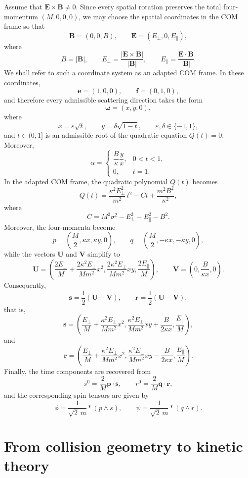 \documentclass[12pt]{article}
\theoremstyle{plain}
\theoremstyle{definition}
\begin{document}
Assume that ${\bm E}\times{\bm B}\neq0$.  
Since every spatial rotation preserves the total four-momentum
$(M,0,0,0)$, we may choose the spatial coordinates in the COM frame so
that
\[
{\bm B}=(0,0,B),
\qquad
{\bm E}=(E_{\perp},0,E_{\parallel}),
\]
where
\[
B=|{\bm B}|,
\qquad
E_{\perp}=\frac{|{\bm E}\times{\bm B}|}{|{\bm B}|},
\qquad
E_{\parallel}
=\frac{{\bm E}\cdot{\bm B}}{|{\bm B}|}.
\]
We shall refer to such a coordinate system as an
adapted COM frame.
In these coordinates,
\[
{\bm e}=(1,0,0),
\qquad
{\bm f}=(0,1,0),
\]
and therefore every admissible scattering direction takes the form
\[
{\bm\omega}
=
(x,y,0),
\]
where
\[
x=\varepsilon\sqrt t,
\qquad
y=\delta\sqrt{1-t},\qquad
\varepsilon,\delta\in\{-1,1\},
\]
and $t\in(0,1]$ is an admissible root of the quadratic equation
$Q(t)=0$.
Moreover,
\[
\alpha=
\begin{cases}
\dfrac{B}{\kappa}\dfrac{y}{x}, & 0<t<1,\\[1.2ex]
0, & t=1.
\end{cases}
\]
In the adapted COM frame, the quadratic polynomial $Q(t)$ becomes
\[
Q(t)
=
\frac{\kappa^2E_\perp^2}{m^2}\,t^2
-
Ct
+
\frac{m^2B^2}{\kappa^2},
\]
where
\[
C=M^2\sigma^2-E_\perp^2-E_\parallel^2-B^2.
\]
Moreover, the four-momenta become
\[
p=\left(\frac M2,\kappa x,\kappa y,0\right),
\qquad
q=\left(\frac M2,-\kappa x,-\kappa y,0\right),
\]
while the vectors ${\bm U}$ and ${\bm V}$ simplify to
\[
{\bm U}
=
\left(
\frac{2E_\perp}{M}
+\frac{2\kappa^2E_\perp}{Mm^2}x^2,
\frac{2\kappa^2E_\perp}{Mm^2}xy,
\frac{2E_\parallel}{M}
\right),
\qquad
{\bm V}
=
\left(
0,
\frac{B}{\kappa x},
0
\right).
\]
Consequently,
\[
{\bm s}
=
\frac12({\bm U}+{\bm V}),
\qquad
{\bm r}
=
\frac12({\bm U}-{\bm V}),
\]
that is,
\[
{\bm s}
=
\left(
\frac{E_\perp}{M}
+\frac{\kappa^2E_\perp}{Mm^2}x^2,
\frac{\kappa^2E_\perp}{Mm^2}xy
+\frac{B}{2\kappa x},
\frac{E_\parallel}{M}
\right),
\]
and
\[
{\bm r}
=
\left(
\frac{E_\perp}{M}
+\frac{\kappa^2E_\perp}{Mm^2}x^2,
\frac{\kappa^2E_\perp}{Mm^2}xy
-\frac{B}{2\kappa x},
\frac{E_\parallel}{M}
\right).
\]
Finally, the time components are recovered from
\[
s^0=\frac{2}{M}{\bm p}\cdot{\bm s},
\qquad
r^0=\frac{2}{M}{\bm q}\cdot{\bm r},
\]
and the corresponding spin tensors are given by
\[
\phi=\frac{1}{\sqrt2\,m}*(p\wedge s),
\qquad
\psi=\frac{1}{\sqrt2\,m}*(q\wedge r).
\]

\section{From collision geometry to kinetic theory}\label{kinetic}
\end{document}
